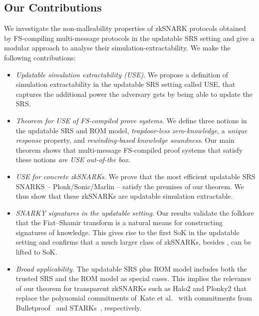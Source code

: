 \subsection{Our Contributions}
We investigate the non-malleability properties of zkSNARK protocols obtained by FS-compiling multi-message protocols in the updatable SRS setting and give a modular approach to analyse their simulation-extractability. We make the following contributions:
\begin{itemize}
\item 
\emph{Updatable simulation extractability (USE)}. 
We propose a definition of simulation extractability in the updatable SRS setting called USE, that captures the additional power the adversary gets by being able to update the SRS. 
    
  \item \emph{Theorem for USE of FS-compiled prove systems.} We
         define three notions in the updatable SRS and ROM model, 
        \emph{trapdoor-less zero-knowledge},
        a \emph{unique response} property, and \emph{rewinding-based
        knowledge soundness}. Our main theorem shows that multi-message FS-compiled proof systems that satisfy these notions \emph{are USE
        out-of-the box}. %
    
\item
\emph{USE for concrete zkSNARKs.}
We prove that the most efficient updatable SRS SNARKS -- Plonk/Sonic/Marlin -- satisfy the premises of our theorem. We thus show that these zkSNARKs are updatable simulation extractable.

\item
  \emph{SNARKY signatures in the updatable setting.} Our results validate the folklore that the Fiat--Shamir transform is a natural means for constructing signatures of knowledge. This gives rise to the first SoK in the updatable setting and confirms that a much larger class of zkSNARKs, besides \cite{C:GroMal17}, can be lifted to SoK.

\item \emph{Broad applicability.} The updatable SRS plus ROM model includes both the trusted SRS and the ROM model as special cases. This implies the relevance of our theorem for transparent zkSNARKs such as Halo2 and Plonky2 that replace the polynomial commitments of~Kate et al.~\cite{AC:KatZavGol10} with commitments from Bulletproof~\cite{SP:BBBPWM18} and STARKs~\cite{EPRINT:BBHR18}, respectively.
  
\end{itemize}



